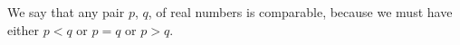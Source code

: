 We say that any pair $p$, $q$, of real numbers is comparable, because
we must have either $p < q$ or $p = q$ or $p > q$.